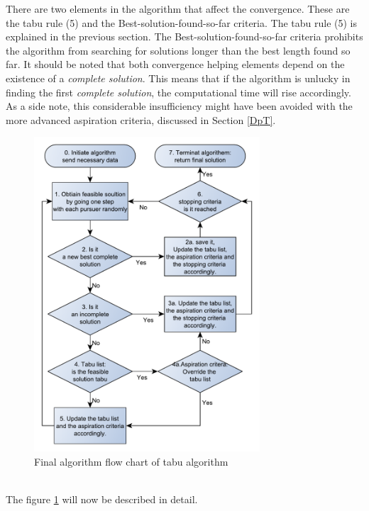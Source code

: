 There are two elements in the algorithm that affect the convergence. These are the tabu rule (5) and the Best-solution-found-so-far criteria. The tabu rule (5) is explained in the previous section. The Best-solution-found-so-far criteria prohibits the algorithm from searching for solutions longer than the best length found so far. It should be noted that both convergence helping elements depend on the existence of a \emph{complete solution}. This means that if the algorithm is unlucky in finding the first \emph{complete solution}, the computational time will rise accordingly. As a side note, this considerable insufficiency might have been avoided with the more advanced aspiration criteria, discussed in Section \ref{DpT}.\\
\begin{figure}[!h]
\centering
\includegraphics[width=0.75\textwidth,height=0.70\textheight]{chapter_4_methods/ny_Tabu}
\caption[Final algorithm flow chart of tabu algorithm]
{Final algorithm flow chart of tabu algorithm}
\label{t2}
\end{figure}
\\The figure \ref{t2} will now be described in detail.
